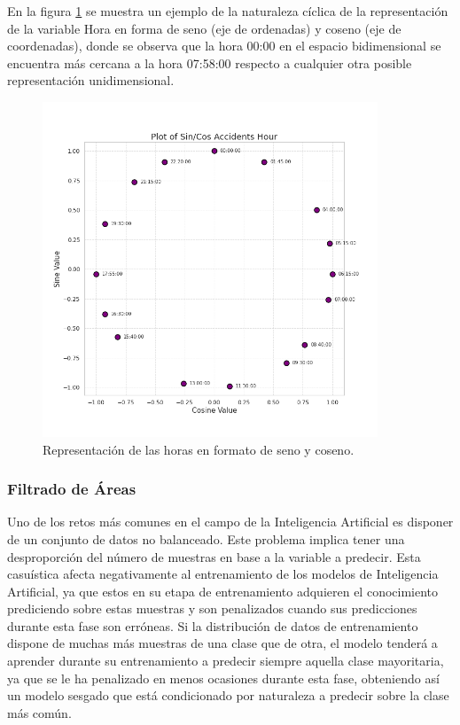 \documentclass{uathesis-es}
\begin{document}
	
	En la figura \ref{HoursPlot} se muestra un ejemplo de la naturaleza cíclica de la representación de la variable Hora en forma de seno (eje de ordenadas) y coseno (eje de coordenadas), donde se observa que la hora 00:00 en el espacio bidimensional se encuentra más cercana a la hora 07:58:00 respecto a cualquier otra posible representación unidimensional.
	
	\begin{figure}[h]
		\centering
		\includegraphics[width=10cm]{Figures/normal_plot.png}
		\caption{Representación de las horas en formato de seno y coseno.}
		\label{HoursPlot}
	\end{figure}
	
	\subsubsection{Filtrado de Áreas}
	
	Uno de los retos más comunes en el campo de la Inteligencia Artificial es disponer de un conjunto de datos no balanceado. Este problema implica tener una desproporción del número de muestras en base a la variable a predecir. Esta casuística afecta negativamente al entrenamiento de los modelos de Inteligencia Artificial, ya que estos en su etapa de entrenamiento adquieren el conocimiento prediciendo sobre estas muestras y son penalizados cuando sus predicciones durante esta fase son erróneas. Si la distribución de datos de entrenamiento dispone de muchas más muestras de una clase que de otra, el modelo tenderá a aprender durante su entrenamiento a predecir siempre aquella clase mayoritaria, ya que se le ha penalizado en menos ocasiones durante esta fase, obteniendo así un modelo sesgado que está condicionado por naturaleza a predecir sobre la clase más común.
	
\end{document}
